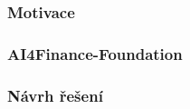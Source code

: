 




\begin{frame}
    \frametitle{Motivace}
%
\end{frame}

\begin{frame}
    \frametitle{AI4Finance-Foundation}
\end{frame}

\begin{frame}
    \frametitle{Návrh řešení}
\end{frame}

